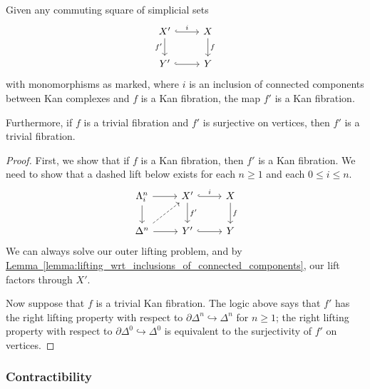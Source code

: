 \documentclass[main.tex]{subfiles}
\begin{document}
\begin{corollary}
  \label{cor:connected_components_kan_fibration}
  Given any commuting square of simplicial sets
  \begin{equation*}
    \begin{tikzcd}
      X'
      \arrow[r, hook, "i"]
      \arrow[d, swap, "f'"]
      & X
      \arrow[d, "f"]
      \\
      Y'
      \arrow[r, hook]
      & Y
    \end{tikzcd}
  \end{equation*}
  with monomorphisms as marked, where $i$ is an inclusion of connected components between Kan complexes and $f$ is a Kan fibration, the map $f'$ is a Kan fibration.

  Furthermore, if $f$ is a trivial fibration and $f'$ is surjective on vertices, then $f'$ is a trivial fibration.
\end{corollary}
\begin{proof}
  First, we show that if $f$ is a Kan fibration, then $f'$ is a Kan fibration. We need to show that a dashed lift below exists for each $n \geq 1$ and each $0 \leq i \leq n$.
  \begin{equation*}
    \begin{tikzcd}
      \Lambda^{n}_{i}
      \arrow[r]
      \arrow[d]
      & X'
      \arrow[r, hook, "i"]
      \arrow[d, "f'"]
      & X
      \arrow[d, "f"]
      \\
      \Delta^{n}
      \arrow[r]
      \arrow[ur, dashed]
      & Y'
      \arrow[r, hook]
      & Y
    \end{tikzcd}
  \end{equation*}
  We can always solve our outer lifting problem, and by \hyperref[lemma:lifting_wrt_inclusions_of_connected_components]{Lemma~\ref*{lemma:lifting_wrt_inclusions_of_connected_components}}, our lift factors through $X'$.

  Now suppose that $f$ is a trivial Kan fibration. The logic above says that $f'$ has the right lifting property with respect to $\partial \Delta^{n} \hookrightarrow \Delta^{n}$ for $n \geq 1$; the right lifting property with respect to $\partial \Delta^{0} \hookrightarrow \Delta^{0}$ is equivalent to the surjectivity of $f'$ on vertices.
\end{proof}

\subsubsection{Contractibility}
\end{document}
